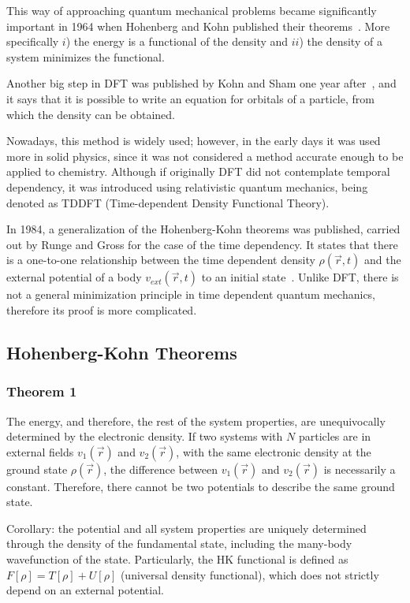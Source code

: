 This way of approaching quantum mechanical problems became significantly
important in 1964 when Hohenberg and Kohn published their
theorems~\cite{Hohenberg1964}. More specifically $i$) the energy is a
functional of the density and $ii$) the density of a system minimizes the
functional.

Another big step in DFT was published by Kohn and Sham one year
after~\cite{Kohn1965}, and it says that it is possible to write an equation for
orbitals of a particle, from which the density can be obtained.

Nowadays, this method is widely used; however, in the early days it was used
more in solid physics, since it was not considered a method accurate enough to
be applied to chemistry.  Although if originally DFT did not contemplate
temporal dependency, it was introduced using relativistic quantum mechanics,
being denoted as \gls{TDDFT} (Time-dependent Density Functional Theory).

In 1984, a generalization of the Hohenberg-Kohn theorems was published, carried
out by Runge and Gross for the case of the time dependency. It states that
there is a one-to-one relationship between the time dependent density $\rho
(\vec{r}, t)$ and the external potential of a body $v_{ext} (\vec{r}, t)$ to an
initial state~\cite{Runge1984}. Unlike DFT, there is not a general minimization
principle in time dependent quantum mechanics, therefore its proof is more
complicated.


\subsection{Hohenberg-Kohn Theorems}\label{HKteoremitas}
\subsubsection{Theorem 1~\cite{Hohenberg1964}}

The energy, and therefore, the rest of the system properties, are unequivocally
determined by the electronic density. If two systems with $N$ particles are in
external fields $v_{1} (\vec{r})$ and $v_{2} (\vec{r})$, with the same
electronic density at the ground state $\rho(\vec{r})$, the difference between
$v_{1} (\vec{r})$ and $v_{2} (\vec{r})$ is necessarily a constant. Therefore,
there cannot be two potentials to describe the same ground state.

Corollary: the potential and all system properties are uniquely determined
through the density of the fundamental state, including the many-body
wavefunction of the state. Particularly, the \gls{HK} functional is defined as
$F[\rho]=T[\rho]+U[\rho]$ (universal density functional), which does not
strictly depend on an external potential.

